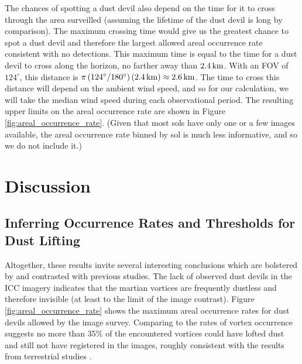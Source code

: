 \documentclass[linenumbers,trackchanges]{aastex63}
\begin{document}
The chances of spotting a dust devil also depend on the time for it to cross through the area surveilled (assuming the lifetime of the dust devil is long by comparison). The maximum crossing time would give us the greatest chance to spot a dust devil and therefore the largest allowed areal occurrence rate consistent with no detections. This maximum time is equal to the time for a dust devil to cross along the horizon, no farther away than $2.4\,{\rm km}$. With an FOV of $124^\circ$, this distance is $\pi \left(124^\circ/180^\circ\right) \left( 2.4\,{\rm km} \right) \approx 2.6\,{\rm km}$. The time to cross this distance will depend on the ambient wind speed, and so for our calculation, we will take the median wind speed during each observational period. The resulting upper limits on the areal occurrence rate are shown in Figure \ref{fig:areal_occurrence_rate}. (Given that most sols have only one or a few images available, the areal occurrence rate binned by sol is much less informative, and so we do not include it.) 

\section{Discussion}
\label{sec:Discussion}

\subsection{Inferring Occurrence Rates and Thresholds for Dust Lifting}
\label{sec:Inferring Occurrence Rates and Thresholds for Dust Lifting}

Altogether, these results invite several interesting conclusions which are bolstered by and contrasted with previous studies. The lack of observed dust devils in the ICC imagery indicates that the martian vortices are frequently dustless and therefore invisible (at least to the limit of the image contrast). Figure \ref{fig:areal_occurrence_rate} shows the maximum areal occurrence rates for dust devils allowed by the image survey. Comparing to the rates of vortex occurrence suggests no more than 35\% of the encountered vortices could have lofted dust and still not have registered in the images, roughly consistent with the results from terrestrial studies \citep{LORENZ20151}.

\end{document}
